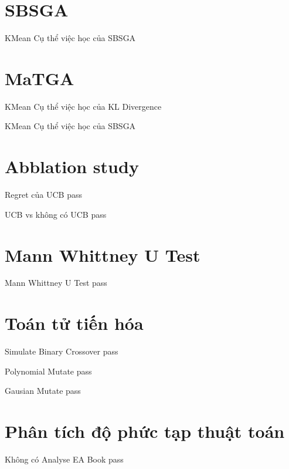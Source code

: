 \section{SBSGA}
    \begin{frame}{KMean}
        Cụ thể việc học của SBSGA
    \end{frame}

\section{MaTGA}
    \begin{frame}{KMean}
        Cụ thể việc học của KL Divergence
    \end{frame}
    \begin{frame}{KMean}
        Cụ thể việc học của SBSGA
    \end{frame}

\section{Abblation study}
    \begin{frame}{Regret của UCB}
        pass
    \end{frame}
    \begin{frame}{UCB vs không có UCB}
        pass
    \end{frame}

\section{Mann Whittney U Test}
    \begin{frame}{Mann Whittney U Test}
        pass
    \end{frame}

\section{Toán tử tiến hóa}
    \begin{frame}{Simulate Binary Crossover}
        pass
    \end{frame}

    \begin{frame}{Polynomial Mutate}
        pass
    \end{frame}

    \begin{frame}{Gausian Mutate}
        pass
    \end{frame}

\section{Phân tích độ phức tạp thuật toán}
    \begin{frame}{Không có Analyse EA Book}
        pass
    \end{frame}